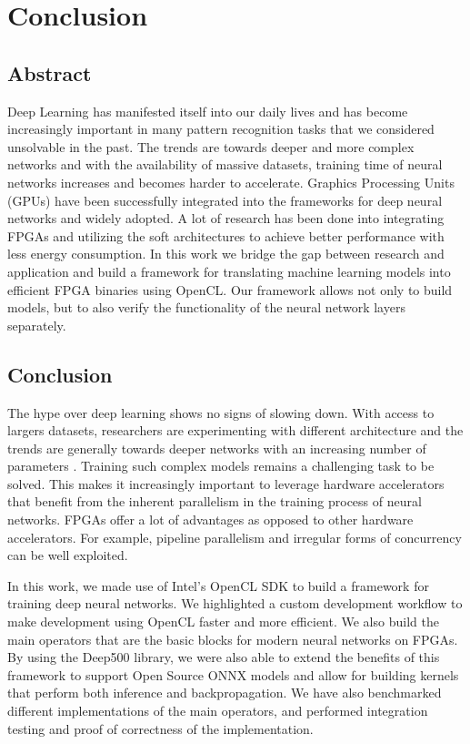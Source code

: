
\chapter{Conclusion} %

\label{Chapter6} %



\section{Abstract}

Deep Learning has manifested itself into our daily lives and has become increasingly important in many pattern recognition tasks that we considered unsolvable in the past. The trends are towards deeper and more complex networks and with the availability of massive datasets, training time of neural networks increases and becomes harder to accelerate. Graphics Processing Units (GPUs) have been successfully integrated into the frameworks for deep neural networks and widely adopted. A lot of research has been done into integrating FPGAs and utilizing the soft architectures to achieve better performance with less energy consumption. In this work we bridge the gap between research and application and build a framework for translating machine learning models into efficient FPGA binaries using OpenCL. Our framework allows not only to build models, but to also verify the functionality of the neural network layers separately. 
 

\section{Conclusion}

The hype over deep learning shows no signs of slowing down. With access to largers datasets, researchers are experimenting with different architecture and the trends are generally towards deeper networks with an increasing number of parameters \citep{ddl}. Training such complex models remains a challenging task to be solved. This makes it increasingly important to leverage hardware accelerators that benefit from the inherent parallelism in the training process of neural networks. FPGAs offer a lot of advantages as opposed to other hardware accelerators. For example, pipeline parallelism and irregular forms of concurrency can be well exploited.

In this work, we made use of Intel's OpenCL SDK to build a framework for training deep neural networks. We highlighted a custom development workflow to make development using OpenCL faster and more efficient. We also build the main operators that are the basic blocks for modern neural networks on FPGAs. By using the Deep500 library, we were also able to extend the benefits of this framework to support Open Source ONNX models and allow for building kernels that perform both inference and backpropagation. We have also benchmarked different implementations of the main operators, and performed integration testing and proof of correctness of the implementation. 

